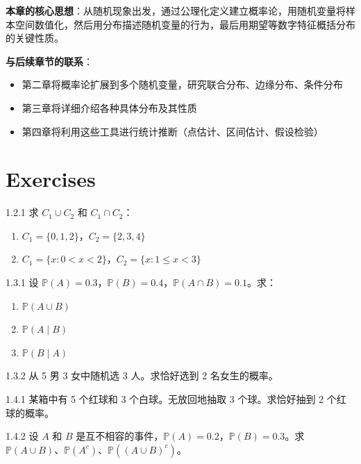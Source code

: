 \textbf{本章的核心思想}：从随机现象出发，通过公理化定义建立概率论，用随机变量将样本空间数值化，然后用分布描述随机变量的行为，最后用期望等数字特征概括分布的关键性质。

\textbf{与后续章节的联系}：
\begin{itemize}
    \item 第二章将概率论扩展到多个随机变量，研究联合分布、边缘分布、条件分布
    \item 第三章将详细介绍各种具体分布及其性质
    \item 第四章将利用这些工具进行统计推断（点估计、区间估计、假设检验）
\end{itemize}

\section*{Exercises}\label{sec:chapter1-exercises}

\begin{exercise}{1.2.1}
求 $C_1 \cup C_2$ 和 $C_1 \cap C_2$：
\begin{enumerate}
    \item $C_1 = \{0, 1, 2\}$，$C_2 = \{2, 3, 4\}$
    \item $C_1 = \{x: 0 < x < 2\}$，$C_2 = \{x: 1 \leq x < 3\}$
\end{enumerate}
\end{exercise}

\begin{exercise}{1.3.1}
设 $\mathbb{P}(A) = 0.3$，$\mathbb{P}(B) = 0.4$，$\mathbb{P}(A \cap B) = 0.1$。求：
\begin{enumerate}
    \item $\mathbb{P}(A \cup B)$
    \item $\mathbb{P}(A \mid B)$
    \item $\mathbb{P}(B \mid A)$
\end{enumerate}
\end{exercise}

\begin{exercise}{1.3.2}
从 5 男 3 女中随机选 3 人。求恰好选到 2 名女生的概率。
\end{exercise}

\begin{exercise}{1.4.1}
某箱中有 5 个红球和 3 个白球。无放回地抽取 3 个球。求恰好抽到 2 个红球的概率。
\end{exercise}

\begin{exercise}{1.4.2}
设 $A$ 和 $B$ 是互不相容的事件，$\mathbb{P}(A) = 0.2$，$\mathbb{P}(B) = 0.3$。求 $\mathbb{P}(A \cup B)$、$\mathbb{P}(A^c)$、$\mathbb{P}((A \cup B)^c)$。
\end{exercise}

